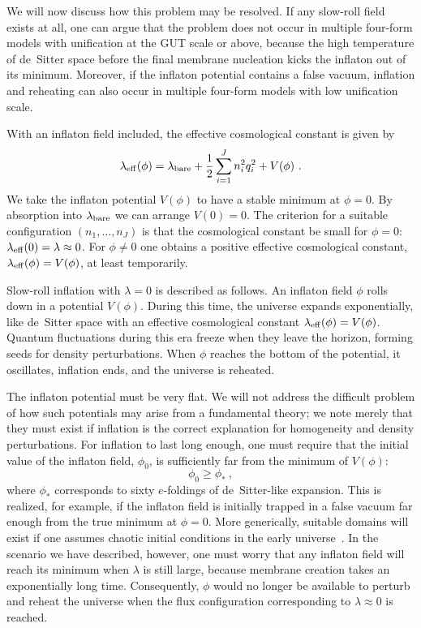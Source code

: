 \documentclass[12pt]{article}
\begin{document}
We will now discuss how this problem may be resolved.  If any
slow-roll field exists at all, one can argue that the problem does not
occur in multiple four-form models with unification at the GUT scale
or above, because the high temperature of de~Sitter space before the
final membrane nucleation kicks the inflaton out of its minimum.
Moreover, if the inflaton potential contains a false vacuum, inflation
and reheating can also occur in multiple four-form models with low
unification scale.


With an inflaton field included, the effective cosmological constant
is given by
\begin{equation}
\lambda_{\rm eff}(\phi) = \lambda_{\rm bare} + \frac{1}{2}
 \sum_{i=1}^{J} {n_i^2 q_i^2 } + V(\phi) \ .
\end{equation}
We take the inflaton potential $V(\phi)$ to have a stable minimum at
$\phi=0$.  By absorption into $\lambda_{\rm bare}$ we can arrange
$V(0)=0$.  The criterion for a suitable configuration $(n_1, \ldots,
n_J)$ is that the cosmological constant be small for $\phi=0$:
$\lambda_{\rm eff}(0) = \lambda \approx 0$.  For $\phi \neq 0$ one
obtains a positive effective cosmological constant, $\lambda_{\rm
eff}(\phi) = V(\phi)$, at least temporarily.

Slow-roll inflation with $\lambda=0$ is described as follows.  An
inflaton field $\phi$ rolls down in a potential $V(\phi)$.  During
this time, the universe expands exponentially, like de~Sitter space
with an effective cosmological constant $\lambda_{\rm eff}(\phi) =
V(\phi)$.  Quantum fluctuations during this era freeze when they leave
the horizon, forming seeds for density perturbations.  When $\phi$
reaches the bottom of the potential, it oscillates, inflation ends,
and the universe is reheated.

The inflaton potential must be very flat.  We will not address the
difficult problem of how such potentials may arise from a fundamental
theory; we note merely that they must exist if inflation is the
correct explanation for homogeneity and density perturbations.  For
inflation to last long enough, one must require that the initial value
of the inflaton field, $\phi_0$, is sufficiently far from the minimum
of $V(\phi)$:
\begin{equation}
\phi_0 \geq \phi_* \ ,
\end{equation}
where $\phi_*$ corresponds to sixty $e$-foldings of de~Sitter-like
expansion.  This is realized, for example, if the inflaton field is
initially trapped in a false vacuum far enough from the true minimum
at $\phi=0$.  More generically, suitable domains will exist if one
assumes chaotic initial conditions in the early universe~\cite{Lin83}.
In the scenario we have described, however, one must worry that any
inflaton field will reach its minimum when $\lambda$ is still large,
because membrane creation takes an exponentially long time.
Consequently, $\phi$ would no longer be available to perturb and
reheat the universe when the flux configuration corresponding to
$\lambda \approx 0$ is reached.
\end{document}
